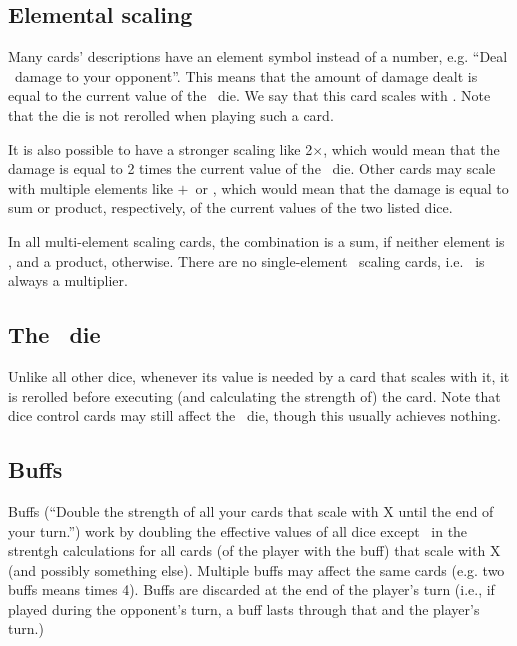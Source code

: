\documentclass[dvipsnames,parskip,a4paper]{scrartcl}
\newcommand{\iconsize}{3.4mm}
\newcommand{\icondepth}{0.45mm}
\newcommand{\icon}[1]{\raisebox{-\icondepth}{\texttt{[image:  \#1 ]}}}
\newcommand{\fire}{\icon{icons/fire.png}}
\newcommand{\earth}{\icon{icons/earth.png}}
\newcommand{\water}{\icon{icons/water.png}}
\newcommand{\magic}{\icon{icons/magic.png}}
\newcommand{\chance}{\icon{icons/chance.png}}
\begin{document}
\subsection*{Elemental scaling}

Many cards' descriptions have an element symbol instead of a number, e.g. ``Deal \fire \ damage to your opponent''. This means that the amount of damage dealt is equal to the current value of the \fire \ die. We say that this card scales with \fire. Note that the die is not rerolled when playing such a card.

\vspace{4pt}

It is also possible to have a stronger scaling like 2\hspace{1pt}$\times$\hspace{1pt}\fire, which would mean that the damage is equal to 2 times the current value of the \fire \ die. Other cards may scale with multiple elements like \earth\hspace{1pt}$+$\hspace{1pt}\chance \ or \water\hspace{1pt}\times\hspace{1pt}\magic, which would mean that the damage is equal to sum or product, respectively, of the current values of the two listed dice.

\vspace{4pt}

In all multi-element scaling cards, the combination is a sum, if neither element is \magic, and a product, otherwise. There are no single-element \magic \ scaling cards, i.e. \magic \ is always a multiplier.

\vspace{4pt}

\subsection*{The \chance \ die}

Unlike all other dice, whenever its value is needed by a card that scales with it, it is rerolled before executing (and calculating the strength of) the card. Note that dice control cards may still affect the \chance \ die, though this usually achieves nothing.

\subsection*{Buffs}

Buffs (``Double the strength of all your cards that scale with X until the end of your turn.'') work by doubling the effective values of all dice except \magic \ in the strentgh calculations for all cards (of the player with the buff) that scale with X (and possibly something else). Multiple buffs may affect the same cards (e.g. two buffs means times 4). Buffs are discarded at the end of the player's turn (i.e., if played during the opponent's turn, a buff lasts through that and the player's turn.)
\end{document}
